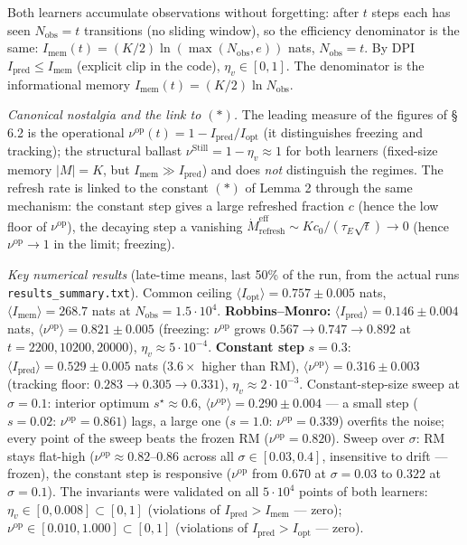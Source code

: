 \documentclass[pdflatex,sn-mathphys-ay]{sn-jnl}
\begin{document}
Both learners accumulate observations without forgetting: after \(t\) steps each has seen \(N_{\text{obs}} = t\) transitions (no sliding window), so the efficiency denominator is the same: \(I_{\text{mem}}(t) = (K/2)\ln(\max(N_{\text{obs}}, e))\) nats, \(N_{\text{obs}} = t\). By DPI \(I_{\text{pred}} \le I_{\text{mem}}\) (explicit clip in the code), \(\eta_v \in [0,1]\). The denominator is the informational memory \(I_{\text{mem}}(t) = (K/2)\ln N_{\text{obs}}\).



\emph{Canonical nostalgia and the link to \((*)\).} The leading measure of the figures of § 6.2 is the operational \(\nu^{\text{op}}(t) = 1 - I_{\text{pred}}/I_{\text{opt}}\) (it distinguishes freezing and tracking); the structural ballast \(\nu^{\text{Still}} = 1 - \eta_v \approx 1\) for both learners (fixed-size memory \(|M| = K\), but \(I_{\text{mem}} \gg I_{\text{pred}}\)) and does \emph{not} distinguish the regimes. The refresh rate is linked to the constant \((*)\) of Lemma 2 through the same mechanism: the constant step gives a large refreshed fraction \(c\) (hence the low floor of \(\nu^{\text{op}}\)), the decaying step a vanishing \(\dot M_{\text{refresh}}^{\text{eff}} \sim K c_0/(\tau_E\sqrt t) \to 0\) (hence \(\nu^{\text{op}} \to 1\) in the limit; freezing).



\emph{Key numerical results} (late-time means, last 50\% of the run, from the actual runs \texttt{results\_summary.txt}). Common ceiling \(\langle I_{\text{opt}}\rangle = 0.757 \pm 0.005\) nats, \(\langle I_{\text{mem}}\rangle = 268.7\) nats at \(N_{\text{obs}} = 1.5 \cdot 10^4\). \textbf{Robbins--Monro:} \(\langle I_{\text{pred}}\rangle = 0.146 \pm 0.004\) nats, \(\langle\nu^{\text{op}}\rangle = 0.821 \pm 0.005\) (freezing: \(\nu^{\text{op}}\) grows \(0.567 \to 0.747 \to 0.892\) at \(t = 2200, 10200, 20000\)), \(\eta_v \approx 5 \cdot 10^{-4}\). \textbf{Constant step} \(s = 0.3\): \(\langle I_{\text{pred}}\rangle = 0.529 \pm 0.005\) nats (\(3.6\times\) higher than RM), \(\langle\nu^{\text{op}}\rangle = 0.316 \pm 0.003\) (tracking floor: \(0.283 \to 0.305 \to 0.331\)), \(\eta_v \approx 2 \cdot 10^{-3}\). Constant-step-size sweep at \(\sigma = 0.1\): interior optimum \(s^\star \approx 0.6\), \(\langle\nu^{\text{op}}\rangle = 0.290 \pm 0.004\) --- a small step (\(s = 0.02\): \(\nu^{\text{op}} = 0.861\)) lags, a large one (\(s = 1.0\): \(\nu^{\text{op}} = 0.339\)) overfits the noise; every point of the sweep beats the frozen RM (\(\nu^{\text{op}} = 0.820\)). Sweep over \(\sigma\): RM stays flat-high (\(\nu^{\text{op}} \approx 0.82\)--\(0.86\) across all \(\sigma \in [0.03, 0.4]\), insensitive to drift --- frozen), the constant step is responsive (\(\nu^{\text{op}}\) from \(0.670\) at \(\sigma = 0.03\) to \(0.322\) at \(\sigma = 0.1\)). The invariants were validated on all \(5 \cdot 10^4\) points of both learners: \(\eta_v \in [0, 0.008] \subset [0,1]\) (violations of \(I_{\text{pred}} > I_{\text{mem}}\) --- zero); \(\nu^{\text{op}} \in [0.010, 1.000] \subset [0,1]\) (violations of \(I_{\text{pred}} > I_{\text{opt}}\) --- zero).
\end{document}
